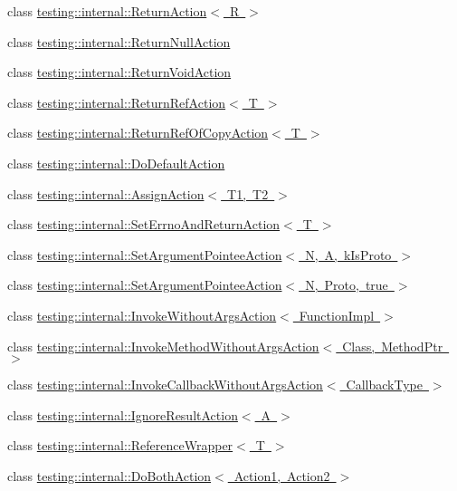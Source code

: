 \begin{DoxyCompactItemize}
\item 
class \mbox{\hyperlink{classtesting_1_1internal_1_1ReturnAction}{testing\+::internal\+::\+Return\+Action$<$ R $>$}}
\item 
class \mbox{\hyperlink{classtesting_1_1internal_1_1ReturnNullAction}{testing\+::internal\+::\+Return\+Null\+Action}}
\item 
class \mbox{\hyperlink{classtesting_1_1internal_1_1ReturnVoidAction}{testing\+::internal\+::\+Return\+Void\+Action}}
\item 
class \mbox{\hyperlink{classtesting_1_1internal_1_1ReturnRefAction}{testing\+::internal\+::\+Return\+Ref\+Action$<$ T $>$}}
\item 
class \mbox{\hyperlink{classtesting_1_1internal_1_1ReturnRefOfCopyAction}{testing\+::internal\+::\+Return\+Ref\+Of\+Copy\+Action$<$ T $>$}}
\item 
class \mbox{\hyperlink{classtesting_1_1internal_1_1DoDefaultAction}{testing\+::internal\+::\+Do\+Default\+Action}}
\item 
class \mbox{\hyperlink{classtesting_1_1internal_1_1AssignAction}{testing\+::internal\+::\+Assign\+Action$<$ T1, T2 $>$}}
\item 
class \mbox{\hyperlink{classtesting_1_1internal_1_1SetErrnoAndReturnAction}{testing\+::internal\+::\+Set\+Errno\+And\+Return\+Action$<$ T $>$}}
\item 
class \mbox{\hyperlink{classtesting_1_1internal_1_1SetArgumentPointeeAction}{testing\+::internal\+::\+Set\+Argument\+Pointee\+Action$<$ N, A, k\+Is\+Proto $>$}}
\item 
class \mbox{\hyperlink{classtesting_1_1internal_1_1SetArgumentPointeeAction_3_01N_00_01Proto_00_01true_01_4}{testing\+::internal\+::\+Set\+Argument\+Pointee\+Action$<$ N, Proto, true $>$}}
\item 
class \mbox{\hyperlink{classtesting_1_1internal_1_1InvokeWithoutArgsAction}{testing\+::internal\+::\+Invoke\+Without\+Args\+Action$<$ Function\+Impl $>$}}
\item 
class \mbox{\hyperlink{classtesting_1_1internal_1_1InvokeMethodWithoutArgsAction}{testing\+::internal\+::\+Invoke\+Method\+Without\+Args\+Action$<$ Class, Method\+Ptr $>$}}
\item 
class \mbox{\hyperlink{classtesting_1_1internal_1_1InvokeCallbackWithoutArgsAction}{testing\+::internal\+::\+Invoke\+Callback\+Without\+Args\+Action$<$ Callback\+Type $>$}}
\item 
class \mbox{\hyperlink{classtesting_1_1internal_1_1IgnoreResultAction}{testing\+::internal\+::\+Ignore\+Result\+Action$<$ A $>$}}
\item 
class \mbox{\hyperlink{classtesting_1_1internal_1_1ReferenceWrapper}{testing\+::internal\+::\+Reference\+Wrapper$<$ T $>$}}
\item 
class \mbox{\hyperlink{classtesting_1_1internal_1_1DoBothAction}{testing\+::internal\+::\+Do\+Both\+Action$<$ Action1, Action2 $>$}}
\end{DoxyCompactItemize}
